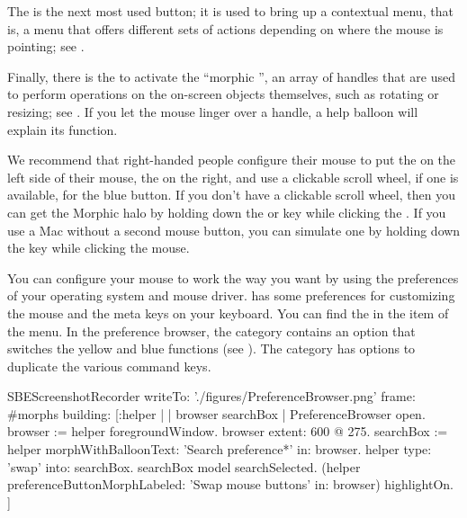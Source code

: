 \documentclass[a4paper,10pt,twoside]{book}
\begin{document}
The  is the next most used button; it is used to bring up a contextual menu, that is, a menu that offers different sets of actions depending on where the mouse is pointing; see .


Finally, there is the  to activate the ``morphic '', an array of handles that are used to perform operations on the on-screen objects themselves, such as rotating or resizing; see .
If you let the mouse linger over a handle, a help balloon will explain its function.


We recommend that right-handed people configure their mouse to put the  on the left side of their mouse, the  on the right, and use a clickable scroll wheel, if one is available, for the blue button.
If you don't have a clickable scroll wheel, then you can get the Morphic halo by holding down the  or  key while clicking the .
If you use a Mac without a second mouse button, you can simulate one by holding down the \clover{} key while clicking the mouse.

You can configure your mouse to work the way you want by using the preferences of your operating system and mouse driver.
\sq has some preferences for customizing the mouse and the meta keys on your keyboard.
You can find the  in the  item of the  menu.
In the preference browser, the  category contains an option  that switches the yellow and blue functions (see ).
The  category has options to duplicate the various command keys.


\begin{ExecuteSmalltalkScript}
SBEScreenshotRecorder writeTo: './figures/PreferenceBrowser.png' frame: #morphs building: [:helper |
	| browser searchBox |
	PreferenceBrowser open.
	browser := helper foregroundWindow.
	browser extent: 600 @ 275.
	searchBox := helper morphWithBalloonText: 'Search preference*' in: browser.
	helper type: 'swap' into: searchBox.
	searchBox model searchSelected.
	(helper preferenceButtonMorphLabeled: 'Swap mouse buttons' in: browser) highlightOn.
]
\end{ExecuteSmalltalkScript}
\end{document}
